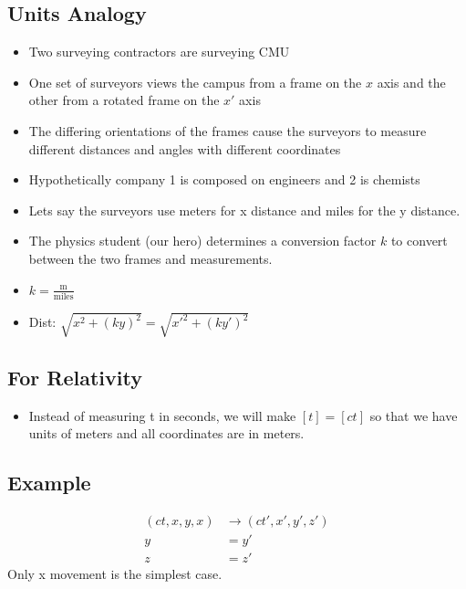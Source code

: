 \documentclass[12pt,letterpaper, twocolumn]{article}
\begin{document}
\subsection{Units Analogy}
\begin{itemize}
    \item Two surveying contractors are surveying CMU
    \item One set of surveyors views the campus from a frame on the $x$ axis and the other from a rotated frame on the $x'$ axis
    \item The differing orientations of the frames cause the surveyors to measure different distances and angles with different coordinates
    \item Hypothetically company 1 is composed on engineers and 2 is chemists
    \item Lets say the surveyors use meters for x distance and miles for the y distance. 
    \item The physics student (our hero) determines a conversion factor $k$ to convert between the two frames and measurements. 
    \item $k=\frac{\text{m}}{\text{miles}}$
    \item Dist: $\sqrt{x^2+(ky)^2}=\sqrt{x'^2+(ky')^2}$
\end{itemize}
\subsection{For Relativity}
\begin{itemize}
    \item Instead of measuring t in seconds, we will make $[t]=[ct]$ so that we have units of meters and all coordinates are in meters. 
\end{itemize}
\subsection{Example}
\begin{align*}
    (ct, x, y, x) &\rightarrow (ct', x', y', z')\\
    y&=y'\\
    z&=z'
\end{align*}
Only x movement is the simplest case. 
\end{document}
